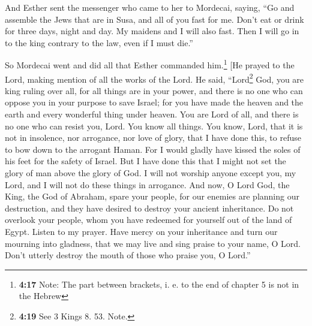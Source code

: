  And Esther sent the messenger who came to her to
Mordecai, saying,  ``Go and assemble the Jews that are in
Susa, and all of you fast for me. Don't eat or drink for three days,
night and day. My maidens and I will also fast. Then I will go in to the
king contrary to the law, even if I must die.''

 So Mordecai went and did all that Esther commanded
him.\footnote{\textbf{4:17} Note: The part between brackets, i. e. to
  the end of chapter 5 is not in the Hebrew}  {[}He
prayed to the Lord, making mention of all the works of the Lord.
 He said, ``Lord\footnote{\textbf{4:19} See 3 Kings 8.
  53. Note.} God, you are king ruling over all, for all things are in
your power, and there is no one who can oppose you in your purpose to
save Israel;  for you have made the heaven and the earth
and every wonderful thing under heaven.  You are Lord of
all, and there is no one who can resist you, Lord.  You
know all things. You know, Lord, that it is not in insolence, nor
arrogance, nor love of glory, that I have done this, to refuse to bow
down to the arrogant Haman.  For I would gladly have
kissed the soles of his feet for the safety of Israel. 
But I have done this that I might not set the glory of man above the
glory of God. I will not worship anyone except you, my Lord, and I will
not do these things in arrogance.  And now, O Lord God,
the King, the God of Abraham, spare your people, for our enemies are
planning our destruction, and they have desired to destroy your ancient
inheritance.  Do not overlook your people, whom you have
redeemed for yourself out of the land of Egypt.  Listen
to my prayer. Have mercy on your inheritance and turn our mourning into
gladness, that we may live and sing praise to your name, O Lord. Don't
utterly destroy the mouth of those who praise you, O Lord.''

